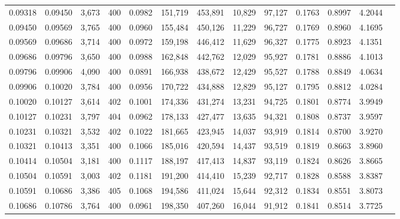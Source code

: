 \begin{tabular}{rrrrrrrrrrrrr}
0.09318 & 0.09450 & 3,673 & 400 &                                     0.0982 & 151,719 & 453,891 &  10,829 &  97,127 & 0.1763 & 0.8997 & 4.2044 \\
0.09450 & 0.09569 & 3,765 & 400 &                                     0.0960 & 155,484 & 450,126 &  11,229 &  96,727 & 0.1769 & 0.8960 & 4.1695 \\
0.09569 & 0.09686 & 3,714 & 400 &                                     0.0972 & 159,198 & 446,412 &  11,629 &  96,327 & 0.1775 & 0.8923 & 4.1351 \\
0.09686 & 0.09796 & 3,650 & 400 &                                     0.0988 & 162,848 & 442,762 &  12,029 &  95,927 & 0.1781 & 0.8886 & 4.1013 \\
0.09796 & 0.09906 & 4,090 & 400 &                                     0.0891 & 166,938 & 438,672 &  12,429 &  95,527 & 0.1788 & 0.8849 & 4.0634 \\
0.09906 & 0.10020 & 3,784 & 400 &                                     0.0956 & 170,722 & 434,888 &  12,829 &  95,127 & 0.1795 & 0.8812 & 4.0284 \\
0.10020 & 0.10127 & 3,614 & 402 &                                     0.1001 & 174,336 & 431,274 &  13,231 &  94,725 & 0.1801 & 0.8774 & 3.9949 \\
0.10127 & 0.10231 & 3,797 & 404 &                                     0.0962 & 178,133 & 427,477 &  13,635 &  94,321 & 0.1808 & 0.8737 & 3.9597 \\
0.10231 & 0.10321 & 3,532 & 402 &                                     0.1022 & 181,665 & 423,945 &  14,037 &  93,919 & 0.1814 & 0.8700 & 3.9270 \\
0.10321 & 0.10413 & 3,351 & 400 &                                     0.1066 & 185,016 & 420,594 &  14,437 &  93,519 & 0.1819 & 0.8663 & 3.8960 \\
0.10414 & 0.10504 & 3,181 & 400 &                                     0.1117 & 188,197 & 417,413 &  14,837 &  93,119 & 0.1824 & 0.8626 & 3.8665 \\
0.10504 & 0.10591 & 3,003 & 402 &                                     0.1181 & 191,200 & 414,410 &  15,239 &  92,717 & 0.1828 & 0.8588 & 3.8387 \\
0.10591 & 0.10686 & 3,386 & 405 &                                     0.1068 & 194,586 & 411,024 &  15,644 &  92,312 & 0.1834 & 0.8551 & 3.8073 \\
0.10686 & 0.10786 & 3,764 & 400 &                                     0.0961 & 198,350 & 407,260 &  16,044 &  91,912 & 0.1841 & 0.8514 & 3.7725 \\

\end{tabular}
